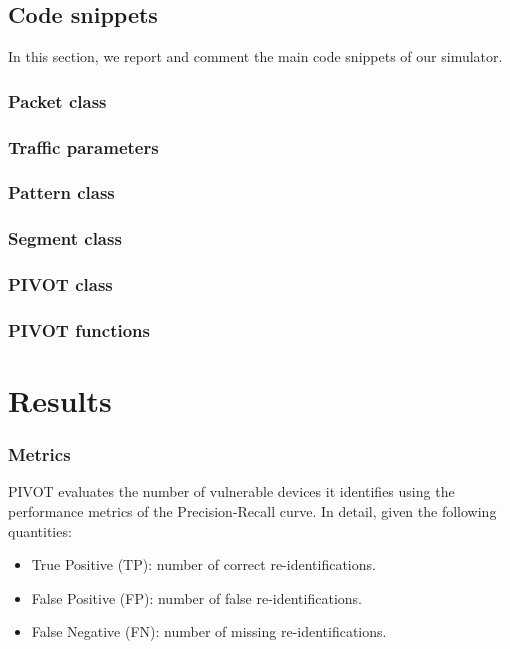 \subsection{Code snippets}
In this section, we report and comment the main code snippets of our simulator.
\subsubsection{Packet class}


\subsubsection{Traffic parameters}


\subsubsection{Pattern class}


\subsubsection{Segment class}


\subsubsection{PIVOT class}


\subsubsection{PIVOT functions}




\section{Results}
\label{results}
\subsubsection{Metrics}
PIVOT evaluates the number of vulnerable devices it identifies using the performance metrics of the Precision-Recall curve. In detail, given the following quantities:
\begin{itemize}
	\item True Positive (TP): number of correct re-identifications. 
	\item False Positive (FP): number of false re-identifications.
	\item False Negative (FN): number of missing re-identifications.
\end{itemize}

